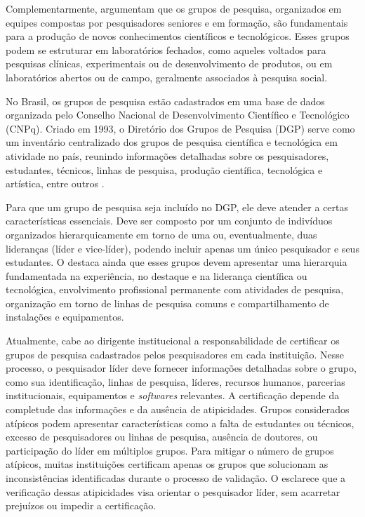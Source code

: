 \documentclass[portuguese]{textolivre}
\begin{document}
Complementarmente, \textcite{erdmann2013} argumentam que os grupos de pesquisa, organizados em equipes compostas por pesquisadores seniores e em formação, são fundamentais para a produção de novos conhecimentos científicos e tecnológicos. Esses grupos podem se estruturar em laboratórios fechados, como aqueles voltados para pesquisas clínicas, experimentais ou de desenvolvimento de produtos, ou em laboratórios abertos ou de campo, geralmente associados à pesquisa social.

No Brasil, os grupos de pesquisa estão cadastrados em uma base de dados organizada pelo Conselho Nacional de Desenvolvimento Científico e Tecnológico (CNPq). Criado em 1993, o Diretório dos Grupos de Pesquisa (DGP) serve como um inventário centralizado dos grupos de pesquisa científica e tecnológica em atividade no país, reunindo informações detalhadas sobre os pesquisadores, estudantes, técnicos, linhas de pesquisa, produção científica, tecnológica e artística, entre outros \cite{chiarini2022}.

Para que um grupo de pesquisa seja incluído no DGP, ele deve atender a certas características essenciais. Deve ser composto por um conjunto de indivíduos organizados hierarquicamente em torno de uma ou, eventualmente, duas lideranças (líder e vice-líder), podendo incluir apenas um único pesquisador e seus estudantes. O \textcite{cnpq2023b} destaca ainda que esses grupos devem apresentar uma hierarquia fundamentada na experiência, no destaque e na liderança científica ou tecnológica, envolvimento profissional permanente com atividades de pesquisa, organização em torno de linhas de pesquisa comuns e compartilhamento de instalações e equipamentos.

Atualmente, cabe ao dirigente institucional a responsabilidade de certificar os grupos de pesquisa cadastrados pelos pesquisadores em cada instituição. Nesse processo, o pesquisador líder deve fornecer informações detalhadas sobre o grupo, como sua identificação, linhas de pesquisa, líderes, recursos humanos, parcerias institucionais, equipamentos e \textit{softwares} relevantes. A certificação depende da completude das informações e da ausência de atipicidades. Grupos considerados atípicos podem apresentar características como a falta de estudantes ou técnicos, excesso de pesquisadores ou linhas de pesquisa, ausência de doutores, ou participação do líder em múltiplos grupos. Para mitigar o número de grupos atípicos, muitas instituições certificam apenas os grupos que solucionam as inconsistências identificadas durante o processo de validação. O \textcite{cnpq2023b} esclarece que a verificação dessas atipicidades visa orientar o pesquisador líder, sem acarretar prejuízos ou impedir a certificação.
\end{document}
